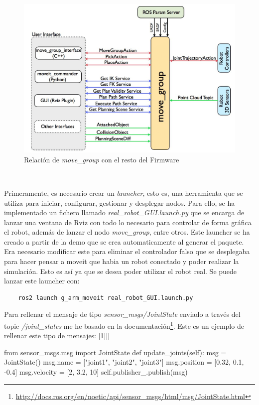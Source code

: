 \begin{figure} [ht!]
    \begin{center}
      \includegraphics[width=15cm]{figs/moveit_arquitectura.png}
    \end{center}
    \caption{Relación de \textit{move\_group} con el resto del Firmware}
    \label{fig:arquitectura_moveit}
\end{figure}\ 

Primeramente, es necesario crear un \textit{launcher}, esto es, una herramienta que se utiliza para iniciar, configurar, gestionar y desplegar nodos. Para ello, 
se ha implementado un fichero llamado \textit{real\_robot\_GUI.launch.py} que se encarga de lanzar una ventana de Rviz con todo lo necesario 
para controlar de forma gráfica el robot, además de lanzar el nodo \textit{move\_group}, entre otros. Este launcher se ha creado a partir 
de la demo que se crea automaticamente al generar el paquete. Era necesario modificar este para eliminar el controlador falso que se desplegaba 
para hacer pensar a moveit que habia un robot conectado y poder realizar la simulación. Esto es así ya que se desea poder utilizar el robot 
real. Se puede lanzar este launcher con:
\begin{verbatim}
    ros2 launch g_arm_moveit real_robot_GUI.launch.py
\end{verbatim}

Para rellenar el mensaje de tipo \textit{sensor\_msgs/JointState} enviado a través del topic \textit{/joint\_states} me he basado 
en la documentación\footnote{\url{http://docs.ros.org/en/noetic/api/sensor_msgs/html/msg/JointState.html}}. 
Este es un ejemplo de rellenar este tipo de mensajes:
[1][]{
  \lstset{
    language=Python,
    basicstyle=\small\ttfamily,
    frame=tb,
    columns=fullflexible,
    showstringspaces=false,
    breaklines=true,
    breakatwhitespace=true,
    captionpos=b,
    #1
  }
}{}
\begin{pythoncode}
from sensor_msgs.msg import JointState
def update_joints(self):
    msg = JointState()
    msg.name = ["joint1", "joint2", "joint3"]
    msg.position = [0.32, 0.1, -0.4]
    msg.velocity = [2, 3.2, 10]     
    self.publisher_.publish(msg)
\end{pythoncode}
\newpage

